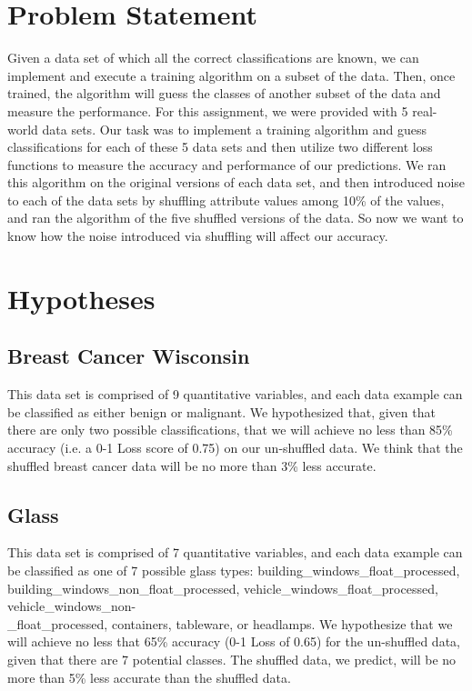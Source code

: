 \documentclass[twoside,11pt]{article}
\begin{document}
\section{Problem Statement}
Given a data set of which all the correct classifications are known, we can implement and execute a training algorithm on a subset of the data. Then, once trained, the algorithm will guess the classes of another subset of the data and measure the performance. For this assignment, we were provided with 5 real-world data sets. Our task was to implement a training algorithm and guess classifications for each of these 5 data sets and then utilize two different loss functions to measure the accuracy and performance of our predictions. We ran this algorithm on the original versions of each data set, and then introduced noise to each of the data sets by shuffling attribute values among 10\% of the values, and ran the algorithm of the five shuffled versions of the data. So now we want to know how the noise introduced via shuffling will affect our accuracy. \\
\section{Hypotheses}

\subsection{Breast Cancer Wisconsin} This data set is comprised of 9 quantitative variables, and each data example can be classified as either benign or malignant. We hypothesized that, given that there are only two possible classifications, that we will achieve no less than 85\% accuracy (i.e. a 0-1 Loss score of 0.75) on our un-shuffled data. We think that the shuffled breast cancer data will be no more than 3\% less accurate.
\subsection{Glass} This data set is comprised of 7 quantitative variables, and each data example can be classified as one of 7 possible glass types: building\_windows\_float\_processed, building\_windows\_non\_float\_processed, vehicle\_windows\_float\_processed, vehicle\_windows\_non- \\ \_float\_processed, containers, tableware, or headlamps. We hypothesize that we will achieve no less that 65\% accuracy (0-1 Loss of 0.65) for the un-shuffled data, given that there are 7 potential classes. The shuffled data, we predict, will be no more than 5\% less accurate than the shuffled data.
\end{document}
